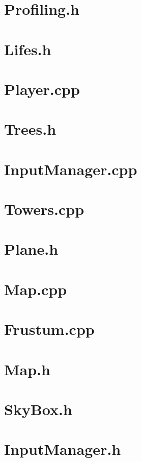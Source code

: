 \section*{Profiling.h}

\pagebreak
\section*{Lifes.h}

\pagebreak
\section*{Player.cpp}

\pagebreak
\section*{Trees.h}

\pagebreak
\section*{InputManager.cpp}

\pagebreak
\section*{Towers.cpp}

\pagebreak
\section*{Plane.h}

\pagebreak
\section*{Map.cpp}

\pagebreak
\section*{Frustum.cpp}

\pagebreak
\section*{Map.h}

\pagebreak
\section*{SkyBox.h}

\pagebreak
\section*{InputManager.h}

\pagebreak
